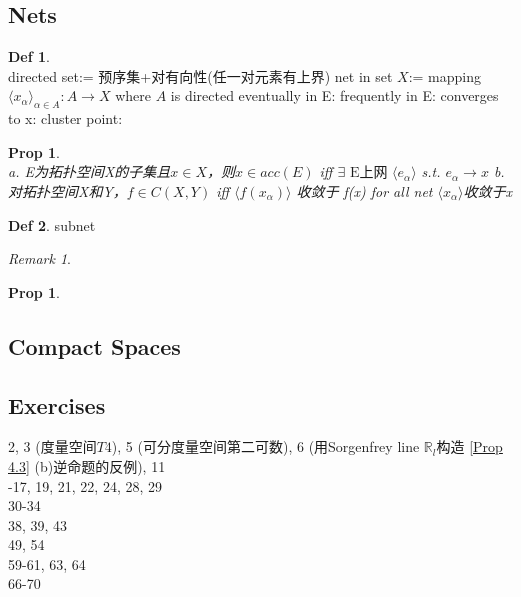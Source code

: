\documentclass[hidelinks]{article}
\theoremstyle{definition}
\newtheorem*{defin}{Def}
\theoremstyle{plain}
\newtheorem{proposition}[theorem]{Prop}
\theoremstyle{remark}
\newtheorem*{remark}{Remark}
\begin{document}
\subsection{Nets}
\begin{defin}~\\
directed set:= 预序集+对有向性(任一对元素有上界) \newline
net in set $X$:=  mapping $\langle x_\alpha\rangle_{\alpha \in A}:A\to X$ where $A$ is directed \newline
eventually in E: \newline
frequently in E: \newline
converges to x: \newline
cluster point: \newline
\end{defin}

\begin{proposition}~\\
a. E为拓扑空间X的子集且$x\in X$，则$x\in acc(E)$ iff $\exists \textrm{ E上网 } \langle e_\alpha\rangle$ s.t. $e_\alpha \to x$ \newline
b. 对拓扑空间X和Y，$f\in C(X,Y)$ iff $\langle f(x_\alpha)\rangle$ 收敛于 f(x) for all net $\langle x_\alpha\rangle$收敛于x
\end{proposition}

\begin{defin}
subnet
\end{defin}

\begin{remark}

\end{remark}

\begin{proposition}

\end{proposition}



\subsection{Compact Spaces}



\subsection{Exercises}
2, 3 (度量空间$T4$), 5 (可分度量空间第二可数), 6 (用Sorgenfrey line $\mathbb{R}_l$构造 \autoref{Prop 4.3} (b)逆命题的反例), 11 \\
-17, 19, 21, 22, 24, 28, 29 \\
30-34 \\
38, 39, 43 \\
49, 54 \\
59-61, 63, 64 \\
66-70 \\
\end{document}

